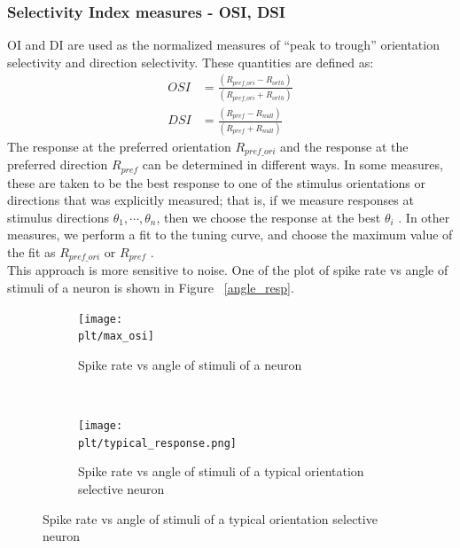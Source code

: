 \documentclass[11pt]{article}
\newcommand{\plt}{../../plots}
\newcommand{\rulesep}{\unskip\ \vrule\ }
\begin{document}
\subsubsection{Selectivity Index measures - OSI, DSI} %
\label{ssub:traditional_selectivity_measures_oi_di_and_osi}
OI and DI are used as the normalized measures of ``peak to trough'' orientation selectivity and direction selectivity.
These quantities are defined as:
\begin{align}
    OSI &= \frac{(R_{pref\_ori} - R_{orth})}{(R_{pref\_ori} + R_{orth})}\\
    DSI &= \frac{(R_{pref} - R_{null})}{(R_{pref} + R_{null})}
\end{align}
The response at the preferred orientation $R_{pref\_ori}$ and the response at the preferred direction $R_{pref}$ can be determined in different ways. In some measures, these are taken to be the best response to one of the stimulus orientations or directions that was explicitly measured; that is, if we measure responses at stimulus directions $\theta_1, \cdots, \theta_n$, then we choose the response at the best $\theta_i$ . In other measures, we perform a fit to the tuning curve, and choose the maximum value of the fit as $R_{pref\_ori}$ or $R_{pref}$ .\\
This approach is more sensitive to noise. One of the plot of spike rate vs angle of stimuli of a neuron is shown in Figure ~\ref{angle_resp}.
\begin{figure}
\centering
\caption{Comparing response of a neuron Vs angle of stimuli with the expected response}
\label{angle_resp}
\begin{subfigure}{.48\textwidth}
    \centering
    \texttt{[image: \\plt/max\_osi]}
    \caption{Spike rate vs angle of stimuli of a neuron}
\end{subfigure}
\rulesep
\begin{subfigure}{.48\textwidth}
    \centering
    \texttt{[image: \\plt/typical\_response.png]}
    \caption{Spike rate vs angle of stimuli of a typical orientation selective neuron}
\end{subfigure}
\end{figure}
\end{document}
